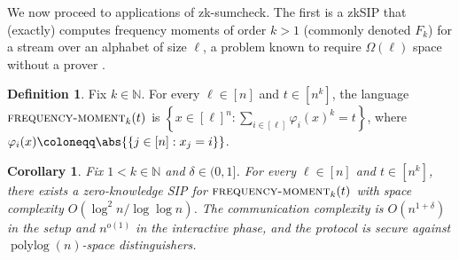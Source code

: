 \documentclass[10pt,a4paper]{article}
\newtheorem{corollary}[theorem]{Corollary}
\theoremstyle{definition}
\newtheorem{definition}[theorem]{Definition}
\newcommand{\zksip}{\textrm{zkSIP}}
\newcommand{\N}{\mathbb N}
\renewcommand{\set}[1]{\left\{#1\right\}}
\newcommand{\polylog}{\operatorname{polylog}}
\newcommand{\frequencymoment}{\normalfont\textsc{frequency-moment}\xspace}
\begin{document}
We now proceed to applications of \textsf{zk-sumcheck}. The first is a \zksip{} that (exactly) computes frequency moments of order $k > 1$ (commonly denoted $F_k$) for a stream over an alphabet of size $\ell$, a problem known to require $\Omega(\ell)$ space without a prover \cite{AMS99}.

\begin{definition}
    \label{def:frequency-moment}
    Fix $k \in \N$. For every $\ell \in [n]$ and $t \in [n^k]$, the language $\frequencymoment_k(t)$ is $\set{x \in [\ell]^n : \sum_{i \in [\ell]} \varphi_i(x)^k = t}$, where $\varphi_i(x) \coloneqq \abs{\set{j \in [n] : x_j = i}}$.
\end{definition}

\begin{corollary}
    \label{cor:frequency-moment}
    Fix $1 < k \in \N$ and $\delta \in (0, 1]$. For every $\ell \in [n]$ and $t \in [n^k]$, there exists a zero-knowledge SIP for $\frequencymoment_k(t)$ with space complexity $O(\log^2 n / \log\log n)$. The communication complexity is $O(n^{1 + \delta})$ in the setup and $n^{o(1)}$ in the interactive phase, and the protocol is secure against $\polylog(n)$-space distinguishers.
\end{corollary}
\end{document}
